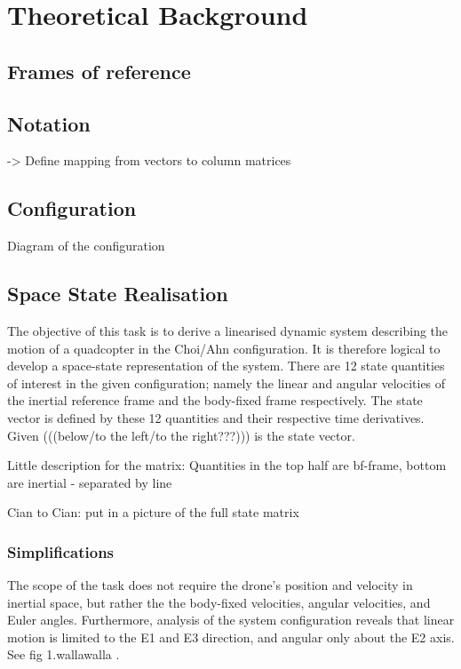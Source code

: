 \section{Theoretical Background}

\subsection{Frames of reference}

\subsection{Notation} %
-> Define mapping from vectors to column matrices
\subsection{Configuration}
Diagram of the configuration

\subsection{Space State Realisation}
The objective of this task is to derive a linearised dynamic system describing the motion of a quadcopter in the Choi/Ahn configuration. It is therefore logical to develop a space-state representation of the system. There are 12 state quantities of interest in the given configuration; namely the linear and angular velocities of the inertial reference frame and the body-fixed frame respectively. The state vector is defined by these 12 quantities and their respective time derivatives. Given (((below/to the left/to the right???))) is the state vector.

Little description for the matrix: Quantities in the top half are bf-frame, bottom are inertial - separated by line

Cian to Cian: put in a picture of the full state matrix
\subsubsection{Simplifications}
The scope of the task does not require the drone's position and velocity in inertial space, but rather the the body-fixed velocities, angular velocities, and Euler angles. Furthermore, analysis of the system configuration reveals that linear motion is limited to the E1 and E3 direction, and angular only about the E2 axis. See fig 1.wallawalla .

